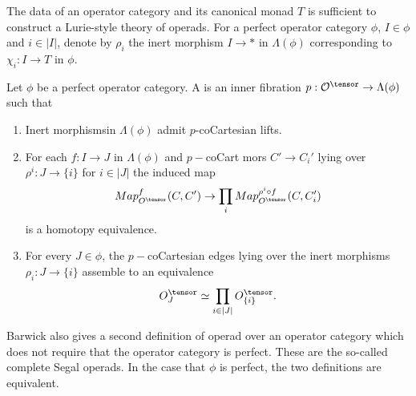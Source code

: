 The data of an operator category and its canonical monad $T$ is sufficient to construct a Lurie-style theory of operads. For a perfect operator category $\phi$, $I\in \phi$ and $i\in |I|$, denote by $\rho_i$ the inert morphism $I\rightarrow *$ in $\Lambda(\phi)$ corresponding to $\chi_i:I\rightarrow T$ in $\phi$.

\begin{definition}
Let $\phi$ be a perfect operator category. A  is an inner fibration $p:\mathcal{O}^\tensor\rightarrow \Lambda(\phi)$ such that
    \begin{enumerate}
        \item Inert morphismsin $\Lambda(\phi)$ admit $p$-coCartesian lifts.
        \item For each $f:I\rightarrow J$ in $\Lambda (\phi)$ and $p-$coCart mors $C'\rightarrow C_i'$ lying over $\rho^i:J \rightarrow \{i\}$ for $i\in |J|$ the induced map 
        $$Map_{O^\tensor}^f(C,C')\rightarrow\prod_i Map_{O^\tensor}^{\rho^i \circ f}(C,C_i')$$
        is a homotopy equivalence.
        \item For every $J\in \phi$, the $p-$coCartesian edges lying over the inert morphisms $\rho_i:J\rightarrow \{i\}$ assemble to an equivalence
        $$O^\tensor_J\simeq \prod_{i\in |J|}O^\tensor_{\{i\}}.$$
    \end{enumerate}
\end{definition}

\begin{remark}
Barwick also gives a second definition of operad over an operator category which does not require that the operator category is perfect. These are the so-called complete Segal operads. In the case that $\phi$ is perfect, the two definitions are equivalent. \cite{Bar18}
\end{remark}